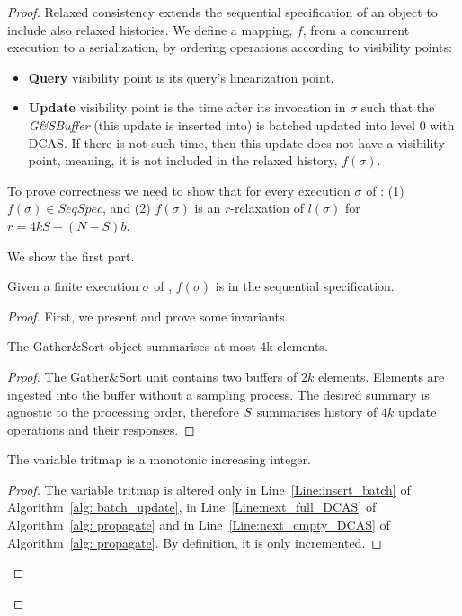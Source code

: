 \begin{proof}
Relaxed consistency extends the sequential specification of an object to include also relaxed histories.
We define a mapping, $f$, from a concurrent execution to a serialization, by ordering operations according to visibility points:
\begin{itemize}
\item \textbf{Query} visibility point is its query's linearization point.
\item \textbf{Update} visibility point is the time after its invocation in $\sigma$ such that the \emph{G\&SBuffer} (this update is inserted into) is batched updated into level 0 with DCAS. If there is not such time, then this update does not have a visibility point, meaning, it is not included in the relaxed history, $f(\sigma)$.
\end{itemize}

To prove correctness we need to show that for every execution $\sigma$ of \mysketch: (1) $f(\sigma) \in \mathit{SeqSpec}$, and (2) $f(\sigma)$ is an $r$-relaxation of $l(\sigma)$ for $r=4kS + (N-S)b$.

We show the first part. 
\begin{lemma} \label{Lem: visibility_in_seq_spec}
Given a finite execution $\sigma$ of \mysketch, $f(\sigma)$ is in the sequential specification. 
\end{lemma}

\begin{proof}
First, we present and prove some invariants. 

\begin{invariant}\label{Inv: GSBuffer_summary}
The Gather\&Sort object summarises at most 4k elements.
\end{invariant}
\begin{proof}
The Gather\&Sort unit contains two buffers of \(2k\) elements. Elements are ingested into the buffer without a sampling process. The desired summary is agnostic to the processing order, therefore \(\mathnormal{S}\) summarises history of \(4k\) update operations and their responses. 
\end{proof}

\begin{lemma}
The variable tritmap is a monotonic increasing integer.
\end{lemma}
\begin{proof}
The variable tritmap is altered only in Line~\ref{Line:insert_batch} of Algorithm~\ref{alg: batch_update}, in Line~\ref{Line:next_full_DCAS} of Algorithm~\ref{alg: propagate} and in Line~\ref{Line:next_empty_DCAS} of Algorithm~\ref{alg: propagate}. By definition, it is only incremented.
\end{proof}



\end{proof}
\end{proof}
